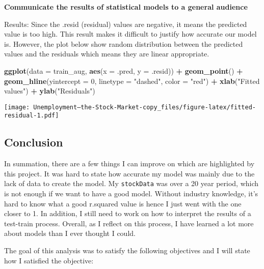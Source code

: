 \documentclass[
]{article}
\newenvironment{Shaded}{\begin{snugshade}}{\end{snugshade}}
\newcommand{\AttributeTok}[1]{\textcolor[rgb]{0.13,0.29,0.53}{#1}}
\newcommand{\DecValTok}[1]{\textcolor[rgb]{0.00,0.00,0.81}{#1}}
\newcommand{\FunctionTok}[1]{\textcolor[rgb]{0.13,0.29,0.53}{\textbf{#1}}}
\newcommand{\NormalTok}[1]{#1}
\newcommand{\SpecialCharTok}[1]{\textcolor[rgb]{0.81,0.36,0.00}{\textbf{#1}}}
\newcommand{\StringTok}[1]{\textcolor[rgb]{0.31,0.60,0.02}{#1}}
\begin{document}
\textbf{Communicate the results of statistical models to a general
audience}

Results: Since the .resid (residual) values are negative, it means the
predicted value is too high. This result makes it difficult to justify
how accurate our model is. However, the plot below show random
distribution between the predicted values and the residuals which means
they are linear appropriate.

\begin{Shaded}
\begin{Highlighting}[]
\FunctionTok{ggplot}\NormalTok{(}\AttributeTok{data =}\NormalTok{ train\_aug, }\FunctionTok{aes}\NormalTok{(}\AttributeTok{x =}\NormalTok{ .pred, }\AttributeTok{y =}\NormalTok{ .resid)) }\SpecialCharTok{+}
  \FunctionTok{geom\_point}\NormalTok{() }\SpecialCharTok{+}
  \FunctionTok{geom\_hline}\NormalTok{(}\AttributeTok{yintercept =} \DecValTok{0}\NormalTok{, }\AttributeTok{linetype =} \StringTok{"dashed"}\NormalTok{, }\AttributeTok{color =} \StringTok{"red"}\NormalTok{) }\SpecialCharTok{+}
  \FunctionTok{xlab}\NormalTok{(}\StringTok{"Fitted values"}\NormalTok{) }\SpecialCharTok{+}
  \FunctionTok{ylab}\NormalTok{(}\StringTok{"Residuals"}\NormalTok{)}
\end{Highlighting}
\end{Shaded}

\texttt{[image: Unemployment---the-Stock-Market-copy\_files/figure-latex/fitted-residual-1.pdf]}

\hypertarget{conclusion}{%
\subsection{Conclusion}\label{conclusion}}

In summation, there are a few things I can improve on which are
highlighted by this project. It was hard to state how accurate my model
was mainly due to the lack of data to create the model. My
\texttt{stockData} was over a 20 year period, which is not enough if we
want to have a good model. Without industry knowledge, it's hard to know
what a good r.squared value is hence I just went with the one closer to
1. In addition, I still need to work on how to interpret the results of
a test-train process. Overall, as I reflect on this process, I have
learned a lot more about models than I ever thought I could.

The goal of this analysis was to satisfy the following objectives and I
will state how I satisfied the objective:
\end{document}
